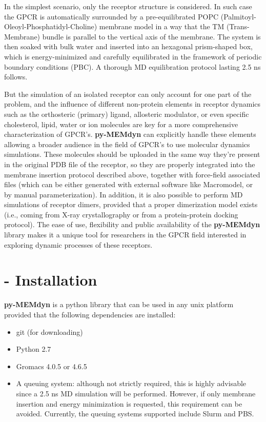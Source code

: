 \documentclass[10pt, oneside, pdftex]{article}
\begin{document}
In   the   simplest  scenario,   only   the   receptor  structure   is
considered. In  such case  the GPCR is  automatically surrounded  by a
pre-equilibrated POPC (Palmitoyl-Oleoyl-Phosphatidyl-Choline) membrane
model in a way that the  TM (Trans-Membrane) bundle is parallel to the
vertical axis  of the  membrane. The system  is then soaked  with bulk
water  and  inserted into  an  hexagonal  prism-shaped  box, which  is
energy-minimized  and  carefully  equilibrated  in  the  framework  of
periodic  boundary  conditions  (PBC).  A  thorough  MD  equilibration
protocol lasting 2.5 ns follows.

But the  simulation of an isolated  receptor can only  account for one
part  of  the problem,  and  the  influence  of different  non-protein
elements  in  receptor  dynamics  such as  the  orthosteric  (primary)
ligand,  allosteric modulator,  or even  specific  cholesterol, lipid,
water   or  ion   molecules   are  key   for   a  more   comprehensive
characterization of GPCR's.   \textbf{py-MEMdyn} can explicitly handle
these elements allowing  a broader audience in the  field of GPCR's to
use molecular dynamics simulations. These molecules should be uploaded
in  the same  way they're  present  in the  original PDB  file of  the
receptor, so they are  properly integrated into the membrane insertion
protocol described  above, together with  force-field associated files
(which can be either generated with external software like Macromodel,
or by manual  parameterization).  In addition, it is  also possible to
perform  MD simulations  of receptor  dimers, provided  that  a proper
dimerization model exists (i.e.,  coming from X-ray crystallography or
from  a   protein-protein  docking   protocol).   The  ease   of  use,
flexibility and public  availability of the \textbf{py-MEMdyn} library
makes it a unique tool for researchers in the GPCR field interested in
exploring dynamic processes of these receptors.

\section*{ - Installation}
\textbf{py-MEMdyn} is a python library that can be used in  any unix
platform provided that the following dependencies are installed:
\begin{itemize}\itemsep0em
\item {git (for downloading)}
\item {Python 2.7}
\item {Gromacs 4.0.5 or 4.6.5}
\item {A queuing system: although  not strictly required, this is highly
  advisable since a 2.5 ns  MD simulation will be performed. However, if
  only membrane  insertion and energy minimization  is requested, this
  requirement can be avoided. Currently, the queuing systems supported
  include Slurm and PBS.}
\end{itemize}
\end{document}
